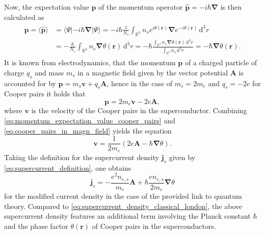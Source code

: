 \documentclass{report}
\numberwithin{tm}{section}
\newcommand\vect[1]{\ensuremath{\bm{#1}}}
\begin{document}
Now, the expectation value $\vect{p}$ of the momentum operator $\hat{\vect{p}} = -i\hbar\vect{\nabla}$ is then calculated as \begin{align}\begin{aligned}\label{eq:momentum_expectation_value_cooper_pairs}
	\vect{p} = \langle \hat{\vect{p}}\rangle &= \langle \Psi|-i\hbar\vect{\nabla}|\Psi\rangle = -i\hbar\frac{1}{N_s}\int_{\mathbb{R}^3}n_s e^{i\theta(\vect{r})}\vect{\nabla}e^{-i\theta(\vect{r})}\,\mathrm{d}^3r \\ &= -\frac{\hbar}{N_s}\int_{\mathbb{R}^3} n_s \vect{\nabla}\theta(\vect{r})\,\mathrm{d}^3r = -\hbar \frac{\int_{\mathbb{R}^3}n_s\vect{\nabla}\theta(\vect{r})\,\mathrm{d}^3 r}{\int_{\mathbb{R}^3}n_s\,\mathrm{d}^3 r} = -\hbar\vect{\nabla}\theta(\vect{r}).
\end{aligned}\end{align} It is known from electrodynamics, that the momentum $\vect{p}$ of a charged particle of charge $q_s$ and mass $m_s$ in a magnetic field given by the vector potential $\vect{A}$ is accounted for by $\vect{p} = m_s\vect{v} + q_s\vect{A}$, hence in the case of $m_s = 2m_e$ and $q_s = -2e$ for Cooper pairs it holds that \begin{equation}\label{eq:cooper_pairs_in_magn_field}
\vect{p} = 2m_e\vect{v} - 2e\vect{A},
\end{equation} where $\vect{v}$ is the velocity of the Cooper pairs in the superconductor. Combining \cref{eq:momentum_expectation_value_cooper_pairs} and \cref{eq:cooper_pairs_in_magn_field} yields the equation \begin{equation}
\vect{v} = \frac{1}{2m_e}\left(2e\vect{A}-\hbar\vect{\nabla}\theta\right).
\end{equation} Taking the definition for the supercurrent density $\vect{j}_s$ given by \cref{eq:supercurrent_definition}, one obtains \begin{equation}
\vect{j}_s = -\frac{e^2n_{e,s}}{m_e}\vect{A} + \hbar\frac{en_{e,s}}{2m_e}\vect{\nabla}\theta
\end{equation} for the modified current density in the case of the provided link to quantum theory. Compared to \cref{eq:supercurrent_density_classical_london}, the above supercurrent density features an additional term involving the Planck constant $\hbar$ and the phase factor $\theta(\vect{r})$ of Cooper pairs in the superconductors.

\end{document}
